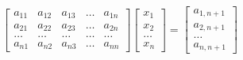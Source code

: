 \documentclass{article}
\begin{document}
\[
\begin{bmatrix}
a_{11} & a_{12} & a_{13} & \dots & a_{1n} \\
a_{21} & a_{22} & a_{23} & \dots & a_{2n} \\
\dots  & \dots  & \dots  & \dots & \dots  \\
a_{n1} & a_{n2} & a_{n3} & \dots & a_{nn} 
\end{bmatrix}
\begin{bmatrix}
x_1 \\ x_2 \\ \dots \\ x_n 
\end{bmatrix}
=
\begin{bmatrix}
a_{1,n+1} \\ a_{2,n+1} \\ \dots \\ a_{n,n+1}
\end{bmatrix}
\]

\medskip
\end{document}
